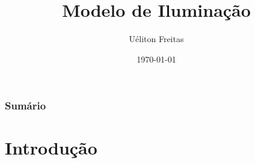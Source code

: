 \documentclass{beamer}
\title[Computação Gráfica]{Modelo de Iluminação} %
\author{Uéliton Freitas} %
\institute[UFMS] %
{
Universidade Católica Don Bosco - UCDB \\ %
\medskip
\textit{freitas.ueliton@gmail.com} %
}
\date{\today} %
\begin{document}
\begin{frame}
\titlepage %
\end{frame}

\begin{frame}
\frametitle{Sumário} %
\tableofcontents %
\end{frame}





\section{Introdução} 

\end{document}
